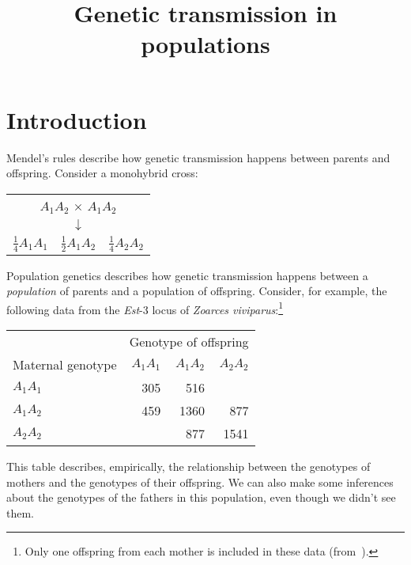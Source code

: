 \documentclass[12pt]{article}
\title{Genetic transmission in populations}
\begin{document}
\maketitle

\thispagestyle{first}

\section*{Introduction}

Mendel's rules describe how genetic transmission happens between
parents and offspring. Consider a monohybrid cross:

\begin{center}
\begin{tabular}{ccc}
\multicolumn{3}{c}{$A_1A_2$ $\times$ $A_1A_2$} \\
 & $\downarrow$ & \\
$\frac{1}{4}A_1A_1$ & $\frac{1}{2}A_1A_2$ & $\frac{1}{4}A_2A_2$ \\
\end{tabular}
\end{center}

\noindent Population genetics describes how genetic transmission
happens between a {\it population\/} of parents and a population of
offspring.  Consider, for example, the following data from the {\it
  Est\/}-3 locus of {\it Zoarces
  viviparus}:\footnote{Only one offspring from each mother is included
  in these data (from~\cite{Christiansen-1980}).}

\begin{center}
\begin{tabular}{lrrr}
                  & \multicolumn{3}{c}{Genotype of offspring} \\
Maternal genotype & $A_1A_1$ & $A_1A_2$ & $A_2A_2$ \\
\hline
$A_1A_1$          &      305 &      516 & \\
$A_1A_2$          &      459 &     1360 & 877 \\
$A_2A_2$          &          &      877 & 1541 \\
\end{tabular}
\end{center}

\noindent This table describes, empirically, the relationship between
the genotypes of mothers and the genotypes of their offspring. We can
also make some inferences about the genotypes of the fathers in this
population, even though we didn't see them.
\end{document}
